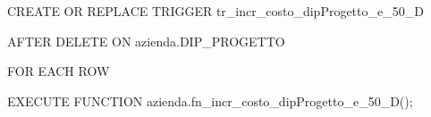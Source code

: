     \ttfamily
        \begin{flushleft}
            \begin{description}
                \item CREATE OR REPLACE TRIGGER tr\_incr\_costo\_dipProgetto\_e\_50\_D
                \item AFTER DELETE ON azienda.DIP\_PROGETTO
                \item FOR EACH ROW
                \item EXECUTE FUNCTION azienda.fn\_incr\_costo\_dipProgetto\_e\_50\_D();
            \end{description}
        \end{flushleft}
    \normalfont